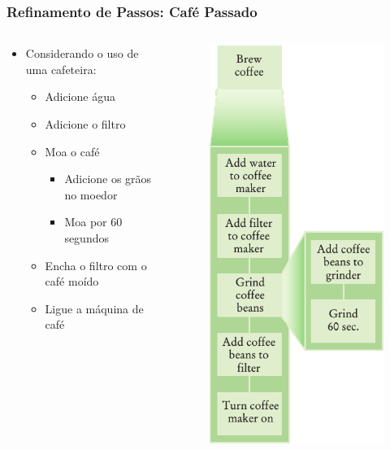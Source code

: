 \documentclass[xcolor={dvipsnames,table},aspectratio=169]{beamer}
\begin{document}
\begin{frame}\frametitle{Refinamento de Passos: Café Passado}
\begin{columns}[T]
	\begin{column}{0.3\linewidth}
		\begin{itemize}
		\item Considerando o uso de uma cafeteira:
		\begin{itemize}
			\item Adicione água
			\item Adicione o filtro
			\item Moa o café
			\begin{itemize}
				\item Adicione os grãos no moedor
				\item Moa por 60 segundos
			\end{itemize}
			\item Encha o filtro com o café moído
			\item Ligue a máquina de café
		\end{itemize}
		\end{itemize}
	\end{column}
	\begin{column}{0.7\linewidth}\begin{figure}[h]
	\includegraphics[height=0.65\paperheight,center]{pucrs-ep-fprog-unidade_05-metodos-laminas-get_coffe_3.png}

\end{figure}
\end{column}
\end{columns}
\end{frame}
\end{document}
